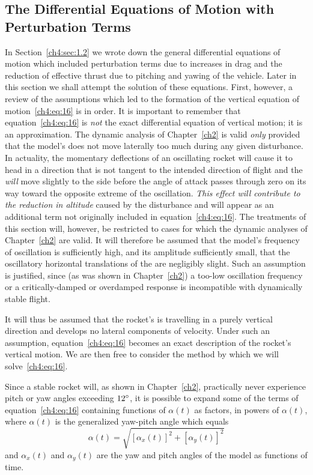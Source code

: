 \subsection{The Differential Equations of Motion with Perturbation Terms}\label{ch4:sec:4.1}

In Section~\ref{ch4:sec:1.2} we wrote down the general differential equations of motion which
included perturbation terms due to increases in drag and the reduction of effective thrust due to
pitching and yawing of the vehicle. Later in this section we shall attempt the solution of these
equations. First, however, a review of the assumptions which led to the formation of the vertical
equation of motion~\eqref{ch4:eq:16} is in order. It is important to remember that
equation~\eqref{ch4:eq:16} is \emph{not} the exact differential equation of vertical motion; it
is an approximation. The dynamic analysis of Chapter~\ref{ch2} is valid \emph{only} provided that
the model's \CG{} does not move laterally too much during any given disturbance. In actuality, the
momentary deflections of an oscillating rocket will cause it to head in a direction that is not
tangent to the intended direction of flight and the \CG{} \emph{will} move slightly to the side
before the angle of attack passes through zero on its way toward the opposite extreme of the
oscillation. \emph{This effect will contribute to the reduction in altitude} caused by the
disturbance and will appear as an additional term not originally included in
equation~\eqref{ch4:eq:16}. The treatments of this section will, however, be restricted to cases
for which the dynamic analyses of Chapter~\ref{ch2} are valid. It will therefore be assumed that
the model's frequency of oscillation is sufficiently high, and its amplitude sufficiently small,
that the oscillatory horizontal translations of the \CG{} are negligibly slight. Such an
assumption is justified, since (as was shown in Chapter~\ref{ch2}) a too-low oscillation frequency
or a critically-damped or overdamped response is incompatible with dynamically stable flight.

It will thus be assumed that the rocket's \CG{} is travelling in a purely vertical direction and
develops no lateral components of velocity. Under such an assumption,
equation~\eqref{ch4:eq:16} becomes an exact description of the rocket's vertical motion. We are
then free to consider the method by which we will solve~\eqref{ch4:eq:16}.

Since a stable rocket will, as shown in Chapter~\ref{ch2}, practically never experience pitch or
yaw angles exceeding $12^{\circ}$, it is possible to expand some of the terms of
equation~\eqref{ch4:eq:16} containing functions of $\alpha(t)$ as factors, in powers of
$\alpha(t)$, where $\alpha(t)$ is the generalized yaw-pitch angle which equals
\begin{equation}\label{ch4:eq:132}
\alpha(t) = \sqrt{[\alpha_x(t)]^{2} + [\alpha_y(t)]^{2}}
\end{equation}
and $\alpha_x(t)$ and $\alpha_y(t)$ are the yaw and pitch angles of the model as functions of
time.

